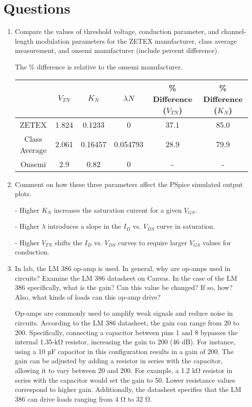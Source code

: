 \documentclass[12pt]{article}
\begin{document}
\section{Questions}
\begin{enumerate}
\item Compare the values of threshold voltage, conduction parameter, and channel-length modulation parameters for the ZETEX manufacturer, class average measurement, and onsemi manufacturer (include percent difference).

The \% difference is relative to the onsemi manufacturer.

\begin{table}[h]
    \centering
    \begin{tabular}{|c|c|c|c|c|c|}
    \hline
    & $V_{TN}$ & $K_N$ & $\lambda N$ & \% Difference ($V_{TN}$) & \% Difference ($K_N$) \\ \hline
    ZETEX & 1.824 & 0.1233 & 0 & 37.1 & 85.0 \\ \hline
    Class Average & 2.061 & 0.16457 & 0.054793 & 28.9 & 79.9 \\ \hline
    Onsemi & 2.9 & 0.82 & 0 & - & - \\ \hline
    \end{tabular}
\end{table}


\item Comment on how these three parameters affect the PSpice simulated output plots.

- Higher $K_N$ increases the saturation current for a given $V_{GS}$. 

- Higher $\lambda$ introduces a slope in the $I_D$ vs. $V_{DS}$ curve in saturation.

- Higher $V_{TN}$ shifts the $I_D$ vs. $V_{DS}$ curves to require larger $V_{GS}$ values for conduction.

\item In lab, the LM 386 op-amp is used. In general, why are op-amps used in circuits? Examine the LM 386 datasheet on Canvas. In the case of the LM 386 specifically, what is the gain? Can this value be changed? If so, how? Also, what kinds of loads can this op-amp drive? 

Op-amps are commonly used to amplify weak signals and reduce noise in circuits. According to the LM 386 datasheet, the gain can range from 20 to 200. Specifically, connecting a capacitor between pins 1 and 8 bypasses the internal 1.35-kΩ resistor, increasing the gain to 200 (46 dB). For instance, using a 10 µF capacitor in this configuration results in a gain of 200. The gain can be adjusted by adding a resistor in series with the capacitor, allowing it to vary between 20 and 200. For example, a 1.2 kΩ resistor in series with the capacitor would set the gain to 50. Lower resistance values correspond to higher gain. Additionally, the datasheet specifies that the LM 386 can drive loads ranging from 4 Ω to 32 Ω.


\end{enumerate}
\end{document}
